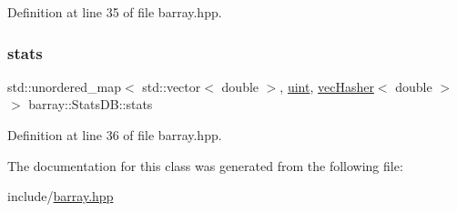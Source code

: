 Definition at line 35 of file barray.\+hpp.

\mbox{\label{classbarray_1_1_stats_d_b_abdf3bb2c4b597f1d356cf5a3609b7211}} 
\subsubsection{\texorpdfstring{stats}{stats}}
{\footnotesize\ttfamily std\+::unordered\+\_\+map$<$ std\+::vector$<$ double $>$, \hyperlink{namespacebarray_af9756a31953db233f80a9cfe1ef31c32}{uint}, \hyperlink{structbarray_1_1vec_hasher}{vec\+Hasher}$<$ double $>$ $>$ barray\+::\+Stats\+D\+B\+::stats}



Definition at line 36 of file barray.\+hpp.



The documentation for this class was generated from the following file\+:\begin{DoxyCompactItemize}
\item 
include/\hyperlink{barray_8hpp}{barray.\+hpp}\end{DoxyCompactItemize}
